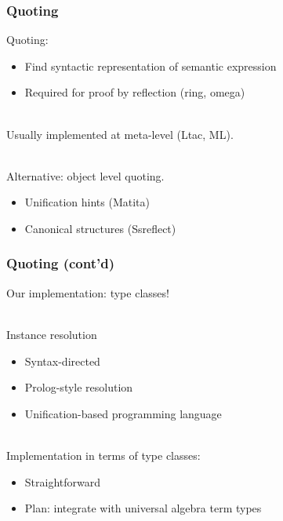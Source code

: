 \documentclass{beamer}
\begin{document}
\begin{frame}
\frametitle{Quoting}

Quoting:
\begin{itemize}
\item Find syntactic representation of semantic expression
\item Required for proof by reflection (ring, omega)
\end{itemize}

\ \\
Usually implemented at meta-level (Ltac, ML).

\ \\
Alternative: object level quoting.
\begin{itemize}
\item Unification hints (Matita)
\item Canonical structures (Ssreflect)
\end{itemize}

\end{frame}
\begin{frame}
\frametitle{Quoting (cont'd)}
Our implementation: type classes!

\ \\
Instance resolution
\begin{itemize}
\item Syntax-directed
\item Prolog-style resolution
\item Unification-based programming language
\end{itemize}

\ \\
Implementation in terms of type classes:
\begin{itemize}
\item Straightforward %
\item Plan: integrate with universal algebra term types
\end{itemize}
\end{frame}
\end{document}
